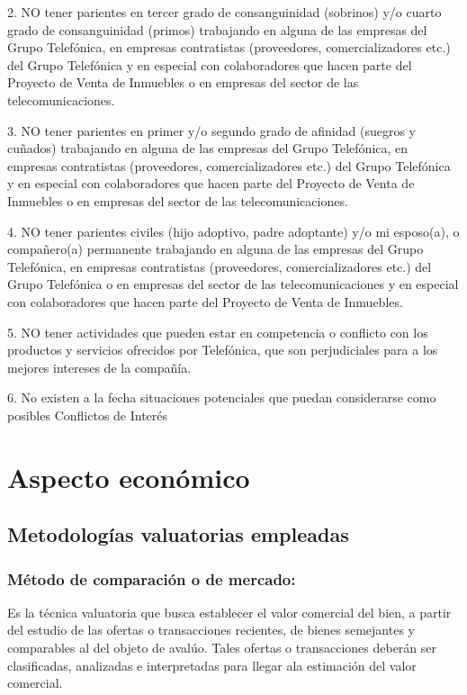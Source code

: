 \documentclass[12pt,a4paper,twoside]{article}
\begin{document}
{2. NO tener parientes en tercer grado de consanguinidad (sobrinos) y/o cuarto grado de consanguinidad (primos) trabajando en alguna de las empresas del Grupo Telefónica, en empresas contratistas (proveedores, comercializadores etc.) del Grupo Telefónica y en especial con colaboradores que hacen parte del Proyecto de Venta de Inmuebles o en empresas del sector de las telecomunicaciones.

3. NO tener parientes en primer y/o segundo grado de afinidad (suegros y cuñados) trabajando en alguna de las empresas del Grupo Telefónica, en empresas contratistas (proveedores, comercializadores etc.) del Grupo Telefónica y en especial con colaboradores que hacen parte del Proyecto de Venta de Inmuebles o en empresas del sector de las telecomunicaciones.

4. NO tener parientes civiles (hijo adoptivo, padre adoptante) y/o mi esposo(a), o compañero(a) permanente trabajando en alguna de las empresas del Grupo Telefónica, en empresas contratistas (proveedores, comercializadores etc.) del Grupo Telefónica o en empresas del sector de las telecomunicaciones y en especial con colaboradores que hacen parte del Proyecto de Venta de Inmuebles.

5. NO tener actividades que pueden estar en competencia o conflicto con los productos y servicios ofrecidos por Telefónica, que son perjudiciales para a los mejores intereses de la compañía.

6. No existen a la fecha situaciones potenciales que puedan considerarse como posibles Conflictos de Interés
	

\section{Aspecto económico}

\subsection{Metodologías valuatorias empleadas}

\subsubsection{Método  de  comparación  o  de  mercado:}  	

Es  la  técnica  valuatoria  que busca  establecer  el  valor  comercial  del  bien,  a  partir  del  estudio  de  las  ofertas  o transacciones recientes, de bienes semejantes y comparables al del objeto de avalúo. Tales ofertas o transacciones deberán ser clasificadas, analizadas e interpretadas para llegar ala estimación del valor comercial.

}
\end{document}
